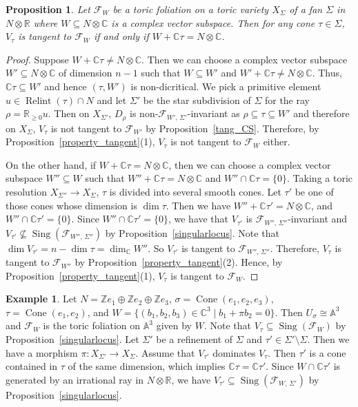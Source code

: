 \documentclass[12pt,reqno]{amsart}
\newtheorem{proposition}[theorem]{Proposition}
\theoremstyle{definition}
\newtheorem{example}[theorem]{Example}
\newcommand{\mb}{\mathbb}
\newcommand{\on}{\operatorname}
\newcommand\cF{{\mathcal{F}}}
\newcommand\bA{{\mathbb A}}
\newcommand\bC{{\mathbb C}}
\newcommand\bR{{\mathbb R}}
\newcommand\bZ{{\mathbb Z}}
\begin{document}
\begin{proposition}\label{tang_combinatoric}
    Let $\cF_W$ be a toric foliation on a toric variety $X_\Sigma$ of a fan $\Sigma$ in $N\otimes\bR$ where $W\subseteq N\otimes\bC$ is a complex vector subspace. 
    Then for any cone $\tau\in\Sigma$, $V_\tau$ is tangent to $\cF_W$ if and only if $W+\bC\tau=N\otimes\bC$. 
\end{proposition}
\begin{proof}
    Suppose $W+\bC\tau\neq N\otimes\bC$. 
    Then we can choose a complex vector subspace $W'\subseteq N\otimes\bC$ of dimension $n-1$ such that $W\subseteq W'$ and $W'+\bC\tau\neq N\otimes\bC$. 
    Thus, $\bC\tau\subseteq W'$ and hence $(\tau,W')$ is non-dicritical. 
    We pick a primitive element $u\in\on{Relint}(\tau)\cap N$ and let $\Sigma'$ be the star subdivision of $\Sigma$ for the ray $\rho=\bR_{\geq 0}u$. 
    Then on $X_{\Sigma'}$, $D_\rho$ is non-$\cF_{W',\,\Sigma'}$-invariant as $\rho\subseteq\tau\subseteq W'$ and therefore on $X_\Sigma$, $V_\tau$ is not tangent to $\cF_{W'}$ by Proposition~\ref{tang_CS}. 
    Therefore, by Proposition~\ref{property_tangent}(1), $V_\tau$ is not tangent to $\cF_W$ either. 

    On the other hand, if $W+\bC\tau = N\otimes\bC$, then we can choose a complex vector subspace $W''\subseteq W$ such that $W''+\bC\tau=N\otimes\bC$ and $W''\cap \bC\tau=\{0\}$. 
    Taking a toric resolution $X_{\Sigma''}\to X_\Sigma$, $\tau$ is divided into several smooth cones. 
    Let $\tau'$ be one of those cones whose dimension is $\dim\tau$. 
    Then we have $W''+\bC\tau'=N\otimes\bC$, and $W''\cap\bC\tau'=\{0\}$. 
    Since $W''\cap\bC\tau'=\{0\}$, we have that $V_{\tau'}$ is $\cF_{W'',\,\Sigma''}$-invariant and $V_{\tau'}\nsubseteq\on{Sing}(\cF_{W'',\,\Sigma''})$ by Proposition~\ref{singularlocus}. 
    Note that $\dim V_{\tau'}=n-\dim\tau=\dim_\bC W''$. 
    So $V_{\tau'}$ is tangent to $\cF_{W'',\,\Sigma''}$. 
    Therefore, $V_\tau$ is tangent to $\cF_{W''}$ by Proposition~\ref{property_tangent}(2). 
    Hence, by Proposition~\ref{property_tangent}(1), $V_\tau$ is tangent to $\cF_W$. 
\end{proof}

\begin{example}
    Let $N=\bZ e_1\oplus \bZ e_2\oplus \bZ e_3$, $\sigma=\on{Cone}(e_1,e_2,e_3)$, $\tau=\on{Cone}(e_1,e_2)$, and $W=\{(b_1,b_2,b_3)\in\bC^3\mid b_1+\pi b_2=0\}$. 
    Then $U_\sigma\cong\bA^3$ and $\cF_W$ is the toric foliation on $\bA^3$ given by $W$. 
    Note that $V_\tau\subseteq\on{Sing}(\cF_W)$ by Proposition~\ref{singularlocus}. 
    Let $\Sigma'$ be a refinement of $\Sigma$ and $\tau'\in\Sigma'\setminus\Sigma$. 
    Then we have a morphism $\pi\colon X_{\Sigma'}\to X_\Sigma$. 
    Assume that $V_{\tau'}$ dominates $V_\tau$. 
    Then $\tau'$ is a cone contained in $\tau$ of the same dimension, which implies $\mb C\tau=\mb C \tau'$. Since $W\cap\mb C\tau'$ is generated by an irrational ray in $N\otimes\bR$, we have $V_{\tau'}\subseteq\on{Sing}(\cF_{W,\,\Sigma'})$ by Proposition~\ref{singularlocus}. 
\end{example}
\end{document}
